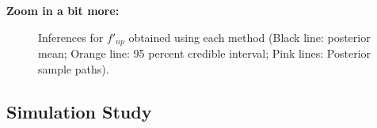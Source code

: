 \documentclass{beamer} %
\begin{document}
\begin{frame}
\textbf{Zoom in a bit more:}

\begin{figure}[p]
    \centering
    \caption{\fontsize{9}{11}\selectfont Inferences for $f'_{np}$ obtained using each method (Black line: posterior mean; Orange line: 95 percent credible interval; Pink lines: Posterior sample paths). }
    \label{fig:comparingTwoG1st_realdata_zoomed}
\end{figure}
\end{frame}





\subsection{Simulation Study}
\end{document}
